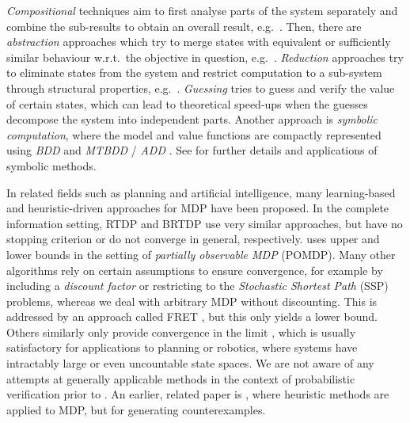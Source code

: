\documentclass{article}
\begin{document}
\emph{Compositional} techniques aim to first analyse parts of the system separately and combine the sub-results to obtain an overall result, e.g.\  \cite{DBLP:conf/qest/CaillaudDLLPW10,DBLP:journals/scp/DengH13,DBLP:conf/concur/HermannsKK13,DBLP:conf/concur/BassetKW14,DBLP:journals/fmsd/ChatterjeeCD15,DBLP:journals/iandc/BassetKW18}.
Then, there are \emph{abstraction} approaches which try to merge states with equivalent or sufficiently similar behaviour w.r.t.\ the objective in question, e.g.\  \cite{DBLP:conf/papm/DArgenioJJL02,DBLP:conf/cav/HermannsWZ08,DBLP:conf/tacas/HahnHWZ10,DBLP:journals/fmsd/KattenbeltKNP10,DBLP:conf/tacas/HahnHWZ10}.
\emph{Reduction} approaches try to eliminate states from the system and restrict computation to a sub-system through structural properties, e.g.\  \cite{DBLP:conf/qest/BaierGC04,DBLP:journals/entcs/BaierDG06,DBLP:conf/qest/CiesinskiBGK08,DBLP:conf/qest/DiazBEF12,DBLP:conf/fm/FanHM18,DBLP:conf/concur/BonnelandJLMS19}.
\emph{Guessing} \cite{DBLP:conf/soda/ChatterjeeMSS23} tries to guess and verify the value of certain states, which can lead to theoretical speed-ups when the guesses decompose the system into independent parts.
Another approach is \emph{symbolic computation}, where the model and value functions are compactly represented using \emph{BDD} \cite{DBLP:journals/tc/Bryant86} and \emph{MTBDD} / \emph{ADD} \cite{DBLP:journals/fmsd/BaharFGHMPS97,DBLP:journals/fmsd/FujitaMY97}.
See \cite{DBLP:conf/concur/BaierKH99,DBLP:journals/sttt/KwiatkowskaNP04,DBLP:conf/aaai/ZamaniSF12,DBLP:conf/qest/WimmerBBHCHDT10,DBLP:journals/corr/BohyBR14a,DBLP:conf/tacas/0001BCDDKM016} for further details and applications of symbolic methods.

In related fields such as planning and artificial intelligence, many learning-based and heuristic-driven approaches for MDP have been proposed.
In the complete information setting, RTDP \cite{DBLP:journals/ai/BartoBS95} and BRTDP \cite{DBLP:conf/icml/McMahanLG05} use very similar approaches, but have no stopping criterion or do not converge in general, respectively.
\cite{DBLP:conf/ijcai/PineauGT03} uses upper and lower bounds in the setting of \emph{partially observable MDP} (POMDP).
Many other algorithms rely on certain assumptions to ensure convergence, for example by including a \emph{discount factor} \cite{DBLP:journals/ml/KearnsMN02} or restricting to the \emph{Stochastic Shortest Path} (SSP) problems, whereas we deal with arbitrary MDP without discounting.
This is addressed by an approach called FRET \cite{DBLP:conf/aips/KolobovMWG11}, but this only yields a lower bound.
Others similarly only provide convergence in the limit \cite{DBLP:journals/corr/abs-1909-07299,DBLP:journals/corr/JonesAKSB15}, which is usually satisfactory for applications to planning or robotics, where systems have intractably large or even uncountable state spaces.
We are not aware of any attempts at generally applicable methods in the context of probabilistic verification prior to \cite{DBLP:conf/atva/BrazdilCCFKKPU14}.
An earlier, related paper is \cite{DBLP:conf/qest/AljazzarL09}, where heuristic methods are applied to MDP, but for generating counterexamples.
\end{document}
